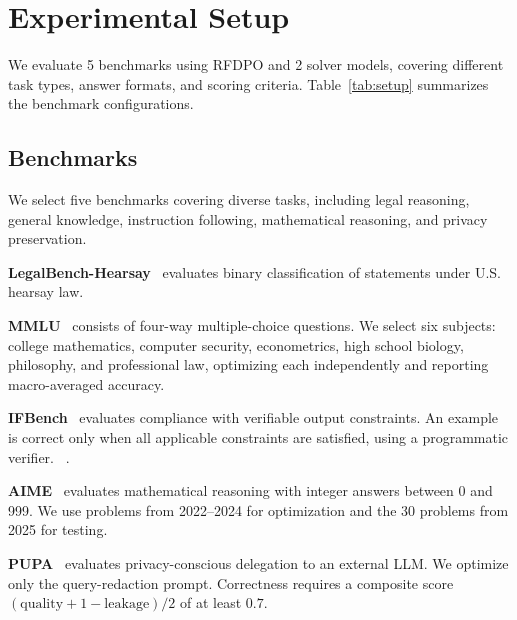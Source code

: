 \documentclass[11pt]{article}
\begin{document}
\section{Experimental Setup}
\label{sec:setup}

We evaluate 5 benchmarks using RFDPO and 2 solver models, covering different task types, answer formats, and scoring criteria. Table~\ref{tab:setup} summarizes the benchmark configurations.

\subsection{Benchmarks}

We select five benchmarks covering diverse tasks, including legal reasoning, general knowledge, instruction following, mathematical reasoning, and privacy preservation.

\textbf{LegalBench-Hearsay}~\citep{guha2023legalbench} evaluates binary classification of statements under U.S. hearsay law.

\textbf{MMLU}~\citep{hendrycks2021mmlu} consists of four-way multiple-choice questions. We select six subjects: college mathematics, computer security, econometrics, high school biology, philosophy, and professional law, optimizing each independently and reporting macro-averaged accuracy.

\textbf{IFBench}~\citep{pyatkin2025ifbench} evaluates compliance with verifiable output constraints. An example is correct only when all applicable constraints are satisfied, using a programmatic verifier. ~\citep{zhou2023ifeval}.

\textbf{AIME}~\citep{maa2025aime} evaluates mathematical reasoning with integer answers between 0 and 999. We use problems from 2022--2024 for optimization and the 30 problems from 2025 for testing.

\textbf{PUPA}~\citep{li2025papillon} evaluates privacy-conscious delegation to an external LLM. We optimize only the query-redaction prompt. Correctness requires a composite score $(\mathrm{quality}+1-\mathrm{leakage})/2$ of at least $0.7$.
\end{document}
